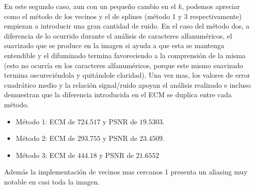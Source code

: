 En este segundo caso, aun con un pequeño cambio en el $k$, podemos apreciar como el método de los vecinos y el de splines (método 1 y 3 respectivamente) empiezan a introducir una gran cantidad de ruido. En el caso del método dos, a diferencia de lo ocurrido durante el análisis de caracteres alfanuméricos, el suavizado que se produce en la imagen si ayuda a que esta se mantenga entendible y el difuminado termina favoreciendo a la comprensión de la misma (esto no ocurría en los caracteres alfanuméricos, porque este mismo suavizado termina oscureciéndola y quitándole claridad).
Una vez mas, los valores de error cuadrático medio y la relación signal/ruido apoyan el análisis realizado e incluso demuestran que la diferencia introducida en el ECM se duplica entre cada método.

\begin{itemize}
 \item Método 1: ECM de $724.517$ y PSNR de $19.5303$.
 \item Método 2: ECM de $293.755$ y PSNR de $23.4509$.
 \item Método 3: ECM de $444.18$ y PSNR de $21.6552$
\end{itemize}

Además la implementación de vecinos mas cercanos 1 presenta un aliasing muy notable en casi toda la imagen.

